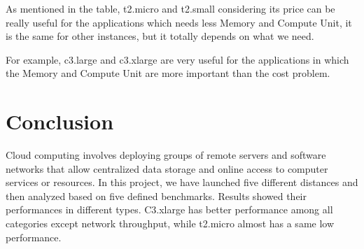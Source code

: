 \documentclass[10pt, conference]{IEEEtran}
\begin{document}
As mentioned in the table, t2.micro and t2.small considering its price can be really useful for the applications which needs less Memory and Compute Unit, it is the same for other instances, but it totally depends on what we need. 

For example, c3.large and c3.xlarge are very useful for the applications in which the Memory and Compute Unit are more important than the cost problem.

\section{Conclusion}
\label{sec:conclusion}
Cloud computing involves deploying groups of remote servers and software networks that allow centralized data storage and online access to computer services or resources. In this project, we have launched five different distances and then analyzed based on five defined benchmarks. Results showed their performances in different types. C3.xlarge has better performance among all categories except network throughput, while t2.micro almost has a same low performance.

\balance


\end{document}
